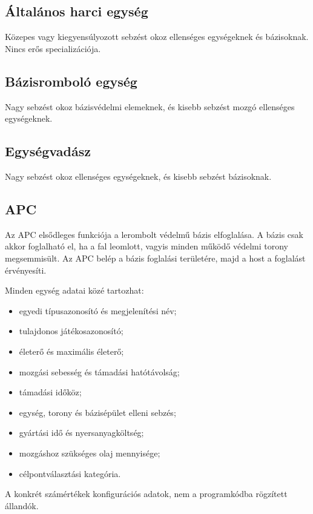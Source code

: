 \documentclass[12pt,a4paper]{article}
\begin{document}
\subsection{Általános harci egység}

Közepes vagy kiegyensúlyozott sebzést okoz ellenséges egységeknek és bázisoknak. Nincs erős specializációja.

\subsection{Bázisromboló egység}

Nagy sebzést okoz bázisvédelmi elemeknek, és kisebb sebzést mozgó ellenséges egységeknek.

\subsection{Egységvadász}

Nagy sebzést okoz ellenséges egységeknek, és kisebb sebzést bázisoknak.

\subsection{APC}

Az APC elsődleges funkciója a lerombolt védelmű bázis elfoglalása. A bázis csak akkor foglalható el, ha a fal leomlott, vagyis minden működő védelmi torony megsemmisült. Az APC belép a bázis foglalási területére, majd a host a foglalást érvényesíti.

Minden egység adatai közé tartozhat:
\begin{itemize}
  \item egyedi típusazonosító és megjelenítési név;
  \item tulajdonos játékosazonosító;
  \item életerő és maximális életerő;
  \item mozgási sebesség és támadási hatótávolság;
  \item támadási időköz;
  \item egység, torony és bázisépület elleni sebzés;
  \item gyártási idő és nyersanyagköltség;
  \item mozgáshoz szükséges olaj mennyisége;
  \item célpontválasztási kategória.
\end{itemize}

A konkrét számértékek konfigurációs adatok, nem a programkódba rögzített állandók.
\end{document}
